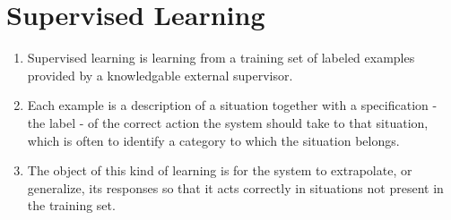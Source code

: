 \section{Supervised Learning \cite{drl-1}}\label{Supervised Learning}

\begin{enumerate}
    \item Supervised learning is learning from a training set of labeled examples provided by a knowledgable external supervisor. \cite{drl-1}

    \item Each example is a description of a situation together with a specification - the label - of the correct action the system should take to that situation, which is often to identify a category to which the situation belongs. \cite{drl-1}
    
    \item The object of this kind of learning is for the system to extrapolate, or generalize, its responses so that it acts correctly in situations not present in the training set. \cite{drl-1}

    
\end{enumerate}